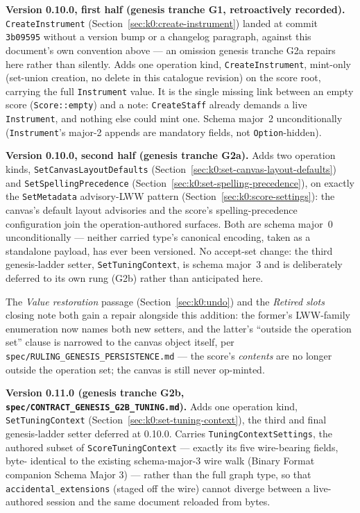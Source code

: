 \documentclass[11pt,letterpaper]{report}
\newcommand{\sectionsc}[1]{{\addfontfeatures{Letters=SmallCaps}#1}}
\begin{document}
\medskip

\noindent\textbf{Version 0.10.0, first half (genesis tranche G1,
retroactively recorded).} \texttt{CreateInstrument}
(Section~\ref{sec:k0:create-instrument}) landed at commit \texttt{3b09595}
without a version bump or a changelog paragraph, against this document's own
convention above --- an omission genesis tranche G2a repairs here rather than
silently. Adds one operation kind, \texttt{CreateInstrument}, mint-only
(set-union creation, no delete in this catalogue revision) on the score root,
carrying the full \texttt{Instrument} value. It is the single missing link
between an empty score (\texttt{Score::empty}) and a note: \texttt{CreateStaff}
already demands a live \texttt{Instrument}, and nothing else could mint one.
Schema major~2 unconditionally (\texttt{Instrument}'s major-2 appends are
mandatory fields, not \texttt{Option}-hidden).

\medskip

\noindent\textbf{Version 0.10.0, second half (genesis tranche G2a).} Adds two
operation kinds, \texttt{SetCanvasLayoutDefaults}
(Section~\ref{sec:k0:set-canvas-layout-defaults}) and
\texttt{SetSpellingPrecedence} (Section~\ref{sec:k0:set-spelling-precedence}),
on exactly the \texttt{SetMetadata} advisory-LWW pattern
(Section~\ref{sec:k0:score-settings}): the canvas's default layout advisories
and the score's spelling-precedence configuration join the operation-authored
surfaces. Both are schema major~0 unconditionally --- neither carried type's
canonical encoding, taken as a standalone payload, has ever been versioned.
No accept-set change: the third genesis-ladder setter,
\texttt{SetTuningContext}, is schema major~3 and is deliberately deferred to
its own rung (G2b) rather than anticipated here.

The \emph{Value restoration} passage
(Section~\ref{sec:k0:undo}) and the \emph{Retired slots} closing note both
gain a repair alongside this addition: the former's LWW-family enumeration
now names both new setters, and the latter's ``outside the operation set''
clause is narrowed to the canvas object itself, per
\texttt{spec/RULING\_GENESIS\_PERSISTENCE.md} --- the score's \emph{contents}
are no longer outside the operation set; the canvas is still never
op-minted.

\medskip

\noindent\textbf{Version 0.11.0 (genesis tranche G2b,
\texttt{spec/CONTRACT\_GENESIS\_G2B\_TUNING.md}).} Adds one operation kind,
\texttt{SetTuningContext} (Section~\ref{sec:k0:set-tuning-context}), the
third and final genesis-ladder setter deferred at 0.10.0. Carries
\texttt{TuningContextSettings}, the authored subset of
\texttt{ScoreTuningContext} --- exactly its five wire-bearing fields, byte-
identical to the existing schema-major-3 wire walk (Binary Format companion
\sectionsc{Schema Major 3}) --- rather than the full graph type, so that
\texttt{accidental\_extensions} (staged off the wire) cannot diverge between
a live-authored session and the same document reloaded from bytes.
\end{document}
